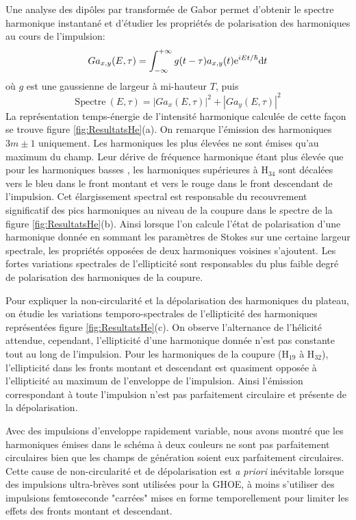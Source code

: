 Une analyse des dipôles par transformée de Gabor permet d'obtenir le spectre harmonique instantané et d'étudier les propriétés de polarisation des harmoniques au cours de l'impulsion:
\begin{equation}
Ga_{x,y} (E,\tau) = \int_{- \infty}^{+\infty} g(t-\tau) a_{x,y}(t) \mathrm{e}^{iEt/\hbar} \mathrm{d} t
\end{equation}
où $g$ est une gaussienne de largeur à mi-hauteur $T$, puis
\begin{equation}
\text{Spectre} \: (E, \tau) = |Ga_x (E,\tau)|^2 + |Ga_y (E,\tau)|^2
\end{equation}
La représentation temps-énergie de l'intensité harmonique calculée de cette façon se trouve figure \ref{fig:ResultatsHe}(a). On remarque l'émission des harmoniques $3m \pm 1$ uniquement. Les harmoniques les plus élevées ne sont émises qu'au maximum du champ.  Leur dérive de fréquence harmonique étant plus élevée que pour les harmoniques basses , les harmoniques supérieures à H$_{34}$ sont décalées vers le bleu dans le front montant et vers le rouge dans le front descendant de l'impulsion. Cet élargissement spectral est responsable du recouvrement significatif des pics harmoniques au niveau de la coupure dans le spectre de la figure \ref{fig:ResultatsHe}(b). Ainsi lorsque l'on calcule l'état de polarisation d'une harmonique donnée en sommant les paramètres de Stokes sur une certaine largeur spectrale, les propriétés opposées de deux harmoniques voisines s'ajoutent. Les fortes variations spectrales de l'ellipticité sont responsables du plus faible degré de polarisation des harmoniques de la coupure.

Pour expliquer la non-circularité et la dépolarisation des harmoniques du plateau, on étudie les variations temporo-spectrales de l'ellipticité des harmoniques représentées figure \ref{fig:ResultatsHe}(c). On observe l'alternance de l'hélicité attendue, cependant, l'ellipticité d'une harmonique donnée n'est pas constante tout au long de l'impulsion. Pour les harmoniques de la coupure (H$_{19}$ à H$_{32}$), l'ellipticité dans les fronts montant et descendant est quasiment opposée à l'ellipticité au maximum de l'enveloppe de l'impulsion. Ainsi l'émission correspondant à toute l'impulsion n'est pas parfaitement circulaire et présente de la dépolarisation.

Avec des impulsions d'enveloppe rapidement variable, nous avons montré que les harmoniques émises dans le schéma à deux couleurs ne sont pas parfaitement circulaires bien que les champs de génération soient eux parfaitement circulaires. Cette cause de non-circularité et de dépolarisation est \textit{a priori} inévitable lorsque des impulsions ultra-brèves sont utilisées pour la GHOE, à moins s'utiliser des impulsions femtoseconde "carrées" mises en forme temporellement pour limiter les effets des fronts montant et descendant.

